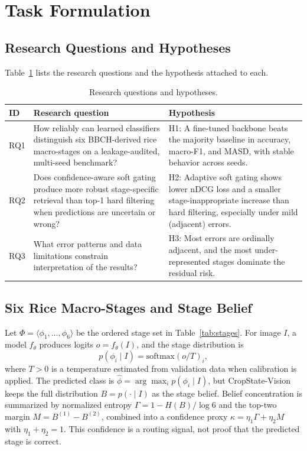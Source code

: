 \documentclass[conference]{IEEEtran}
\begin{document}
\section{Task Formulation}

\subsection{Research Questions and Hypotheses}

Table~\ref{tab:rq} lists the research questions and the hypothesis attached to each.

\begin{table}[t]
\centering
\caption{Research questions and hypotheses.}
\label{tab:rq}
\small
\begin{tabular}{p{}p{}p{}}
\toprule
\textbf{ID} & \textbf{Research question} & \textbf{Hypothesis} \\
\midrule
RQ1 & How reliably can learned classifiers distinguish six BBCH-derived rice macro-stages on a leakage-audited, multi-seed benchmark? &
H1: A fine-tuned backbone beats the majority baseline in accuracy, macro-F1, and MASD, with stable behavior across seeds. \\[4pt]
RQ2 & Does confidence-aware soft gating produce more robust stage-specific retrieval than top-1 hard filtering when predictions are uncertain or wrong? &
H2: Adaptive soft gating shows lower nDCG loss and a smaller stage-inappropriate increase than hard filtering, especially under mild (adjacent) errors. \\[4pt]
RQ3 & What error patterns and data limitations constrain interpretation of the results? &
H3: Most errors are ordinally adjacent, and the most under-represented stages dominate the residual risk. \\
\bottomrule
\end{tabular}
\end{table}

\subsection{Six Rice Macro-Stages and Stage Belief}

Let $\Phi = \langle \phi_1,\dots,\phi_6 \rangle$ be the ordered stage set in Table~\ref{tab:stages}. For image $I$, a model $f_\theta$ produces logits $o = f_\theta(I)$, and the stage distribution is
\begin{equation}
p(\phi_i \mid I) = \mathrm{softmax}(o/T)_i,
\label{eq:softmax}
\end{equation}
where $T > 0$ is a temperature estimated from validation data when calibration is applied. The predicted class is $\hat{\phi} = \arg\max_i p(\phi_i \mid I)$, but CropState-Vision keeps the full distribution $B=p(\cdot\mid I)$ as the stage belief. Belief concentration is summarized by normalized entropy $\Gamma = 1 - H(B)/\log 6$ and the top-two margin $M = B^{(1)} - B^{(2)}$, combined into a confidence proxy $\kappa = \eta_1\Gamma + \eta_2 M$ with $\eta_1+\eta_2=1$. This confidence is a routing signal, not proof that the predicted stage is correct.
\end{document}
